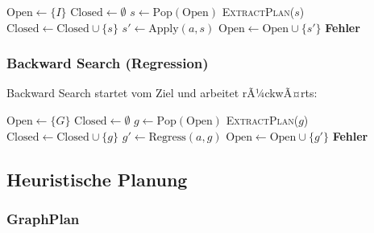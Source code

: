 ﻿\documentclass[a4paper,12pt]{article}
\theoremstyle{definition}
\begin{document}
\begin{algorithm}[H]
	\caption{VorwÃ¤rts-Zustandsraumsuche}
	\begin{algorithmic}[1]
		\State $\text{Open} \gets \{I\}$ 
		\State $\text{Closed} \gets \emptyset$
		\State $s \gets \text{Pop}(\text{Open})$ 
		\State \Return \textsc{ExtractPlan}($s$)
		\EndeWenn
		\State $\text{Closed} \gets \text{Closed} \cup \{s\}$
		\State $s' \gets \text{Apply}(a, s)$
		\State $\text{Open} \gets \text{Open} \cup \{s'\}$
		\EndeWenn
		\EndeFuer
		\EndeWaehrend
		\State \Return \textbf{Fehler}
		\EndProzedur
	\end{algorithmic}
\end{algorithm}

\subsubsection{Backward Search (Regression)}

Backward Search startet vom Ziel und arbeitet rÃ¼ckwÃ¤rts:

\begin{algorithm}[H]
	\caption{RÃ¼ckwÃ¤rts-Regressionssuche}
	\begin{algorithmic}[1]
		\State $\text{Open} \gets \{G\}$ 
		\State $\text{Closed} \gets \emptyset$
		\State $g \gets \text{Pop}(\text{Open})$
		\State \Return \textsc{ExtractPlan}($g$)
		\EndeWenn
		\State $\text{Closed} \gets \text{Closed} \cup \{g\}$
		\State $g' \gets \text{Regress}(a, g)$ 
		\State $\text{Open} \gets \text{Open} \cup \{g'\}$
		\EndeWenn
		\EndeFuer
		\EndeWaehrend
		\State \Return \textbf{Fehler}
		\EndProzedur
	\end{algorithmic}
\end{algorithm}

\subsection{Heuristische Planung}

\subsubsection{GraphPlan}
\end{document}
